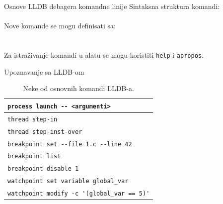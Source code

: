 \documentclass[bookmarks=true,bookmarksopen=true,pdfborder={0 0 0},pdfhighlight={/N},linkbordercolor={.5 .5 .5},implicit=false,unicode,xcolor={table}]{beamer}
\begin{document}
\begin{frame}[fragile]{Osnove LLDB debagera komandne linije}
  Sintaksna struktura komandi:
  {\color{mymauve}{
    \verb|<noun> <verb> [-option [value]] [argument [argument...]]|
  }}\\~\\

  
  Nove komande se mogu definisati sa:\\
  {\color{mymauve}{\verb|command alias|}}\\~\\

  Za istraživanje komandi u alatu se mogu koristiti {\color{mymauve}\verb|help|} i {\color{mymauve}\verb|apropos|}.
\end{frame}

\begin{frame}[fragile]{Upoznavanje sa LLDB-om}
  \begin{table}[h!]
    \begin{center}
      \caption{Neke od osnovnih komandi LLDB-a.}
      \small
      \begin{tabular}{|>{\color{mymauve}}l|}
        \hline
	\verb|process launch -- <argumenti>|
	\\ \hline
	\verb|thread step-in|
	\\ \hline
	\verb|thread step-inst-over|
	\\ \hline
	\verb|breakpoint set --file 1.c --line 42|
	\\ \hline
	\verb|breakpoint list|
	\\ \hline
	\verb|breakpoint disable 1|
	\\ \hline
        \verb|watchpoint set variable global_var|
        \\ \hline
        \verb|watchpoint modify -c '(global_var == 5)'|
        \\ \hline
      \end{tabular}
    \end{center}
  \end{table}
\end{frame}
\end{document}
